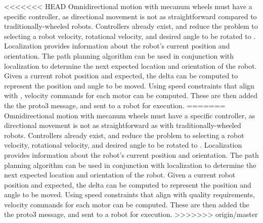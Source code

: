 <<<<<<< HEAD
Omnidirectional motion with mecanum wheels must have a specific controller, as directional movement is not as straightforward compared to traditionally-wheeled robots. Controllers already exist, and reduce the problem to selecting a robot velocity, rotational velocity, and desired angle to be rotated to \cite{mecanumcontrol}. Localization provides information about the robot's current position and orientation. The path planning algorithm can be used in conjunction with localization to determine the next expected location and orientation of the robot. Given a current robot position and expected, the delta can be computed to represent the position and angle to be moved. Using speed constraints that align with , velocity commands for each motor can be computed. These are then added the the proto3 message, and sent to a robot for execution.
=======
Omnidirectional motion with mecanum wheels must have a specific controller, as directional movement is not as straightforward as with traditionally-wheeled robots. Controllers already exist, and reduce the problem to selecting a robot velocity, rotational velocity, and desired angle to be rotated to \cite{mecanumcontrol}. Localization provides information about the robot's current position and orientation. The path planning algorithm can be used in conjunction with localization to determine the next expected location and orientation of the robot. Given a current robot position and expected, the delta can be computed to represent the position and angle to be moved. Using speed constraints that align with quality requirements, velocity commands for each motor can be computed. These are then added the the proto3 message, and sent to a robot for execution.
>>>>>>> origin/master
